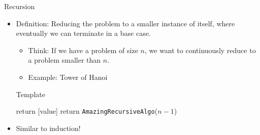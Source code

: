 \documentclass{beamer}
\begin{document}
\begin{frame}[t]{Recursion}
  \begin{itemize}
    \item \alert{Definition:} Reducing the problem to a smaller instance of itself, where eventually we can terminate in a base case.
    \begin{itemize}
        \item Think: If we have a problem of size $n$, we want to continuously reduce to a problem smaller than $n$.
        \item Example: Tower of Hanoi
    \end{itemize}
    \begin{exampleblock}{Template}
        \begin{algorithmic}[1]
                        \State return [value]
                    \Else 
                        \State return \texttt{AmazingRecursiveAlgo}($n-1$)
                    \EndIf
                \EndProcedure
        \end{algorithmic}
        
    \end{exampleblock}
    \item Similar to \alert{induction}!
  \end{itemize}
\end{frame}
\end{document}
